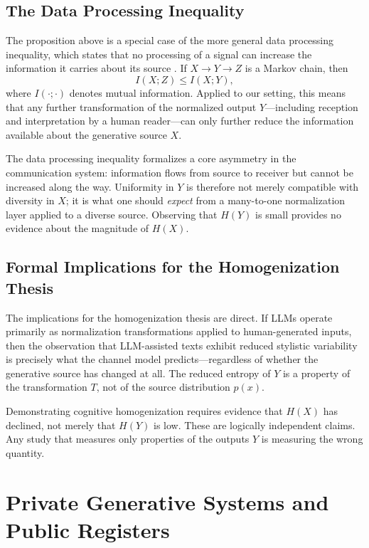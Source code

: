 \documentclass[12pt,a4paper]{article}
\theoremstyle{definition}
\theoremstyle{plain}
\theoremstyle{remark}
\begin{document}
\subsection{The Data Processing Inequality}

The proposition above is a special case of the more general data processing inequality, which
states that no processing of a signal can increase the information it carries about its
source \citep{shannon1948}. If $X \to Y \to Z$ is a Markov chain, then
\[
I(X; Z) \leq I(X; Y),
\]
where $I(\cdot ; \cdot)$ denotes mutual information. Applied to our setting, this means that
any further transformation of the normalized output $Y$---including reception and
interpretation by a human reader---can only further reduce the information available about
the generative source $X$.

The data processing inequality formalizes a core asymmetry in the communication system:
information flows from source to receiver but cannot be increased along the way. Uniformity
in $Y$ is therefore not merely compatible with diversity in $X$; it is what one should
\emph{expect} from a many-to-one normalization layer applied to a diverse source. Observing
that $H(Y)$ is small provides no evidence about the magnitude of $H(X)$.

\subsection{Formal Implications for the Homogenization Thesis}

The implications for the homogenization thesis are direct. If LLMs operate primarily as
normalization transformations applied to human-generated inputs, then the observation that
LLM-assisted texts exhibit reduced stylistic variability is precisely what the channel model
predicts---regardless of whether the generative source has changed at all. The reduced entropy
of $Y$ is a property of the transformation $T$, not of the source distribution $p(x)$.

Demonstrating cognitive homogenization requires evidence that $H(X)$ has declined, not merely
that $H(Y)$ is low. These are logically independent claims. Any study that measures only
properties of the outputs $Y$ is measuring the wrong quantity.

\section{Private Generative Systems and Public Registers}
\label{sec:private}
\end{document}
